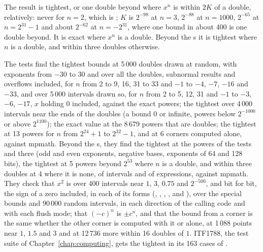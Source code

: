 \documentclass[12pt,a4paper,twoside,openright]{book}
\begin{document}
The result is tightest, or one double beyond where $x^n$ is within $2K$ of
a double, relatively: never for $n=2$, which is ; $K$ is
$2^{-98}$ at $n=3$, $2^{-88}$ at $n=1000$, $2^{-65}$ at $n=2^{31}-1$ and
about $2^{-62}$ at $n=-2^{31}$, where one bound in about 400 is one double
beyond. It is exact where $x^n$ is a double. Beyond the s it is
tightest where $n$ is a double, and within three doubles otherwise.

The tests find the tightest bounds at 5\,000 doubles drawn at random, with
exponents from $-30$ to $30$ and over all the doubles, subnormal results and
overflows included, for $n$ from 2 to 9, 16, 31 to 33 and $-1$ to $-4$,
$-7$, $-16$ and $-33$, and over 5\,000 intervals drawn so, for $n$ from 2
to 5, 12, 31 and $-1$ to $-3$, $-6$, $-17$, $x$ holding $0$ included,
against the exact powers; the tightest over 4\,000 intervals near the ends
of the doubles (a bound $0$ or infinite, powers below $2^{-1000}$ or above
$2^{1100}$); the exact value at the 8\,679 powers that are doubles; the
tightest at 13 powers for $n$ from $2^{24}+1$ to $2^{32}-1$, and at 6
corners computed alone, against mpmath. Beyond the s, they find
the tightest at the powers of the tests  and
 there (odd and even exponents, negative bases, exponents of
64 and 128 bits), the tightest at 5 powers beyond $2^{53}$ where $n$ is a
double, and within three doubles at 4 where it is none, of intervals and of
expressions, against mpmath. They check that $x^2$ is  over
400 intervals near $1$, $3$, $0.75$ and $2^{-500}$, and bit for bit, the
sign of a zero included, in each of its forms (,
, , \code{[2]},  and
), over the special bounds and 90\,000 random intervals,
in each direction of the calling code and with each flush mode; that
$(-c)^n$ is $\pm c^n$, and that the bound from a corner is the same whether
the other corner is computed with it or alone, at 1\,088 points near $1$,
$1.5$ and $3$ and at 12\,736 more within 16 doubles of $1$. ITF1788, the
test suite of Chapter~\ref{chap:computing}, gets the tightest in its 163
cases of .
\end{document}
